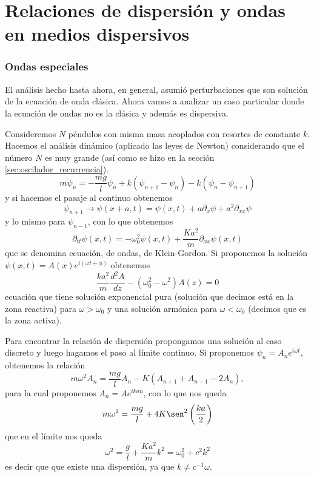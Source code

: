 \documentclass[a4paper,spanish]{article}
\numberwithin{equation}{section}
\begin{document}
\part{Relaciones de dispersi\'on y ondas en medios dispersivos}

\section{Ondas especiales}
	El an\'alisis hecho hasta ahora, en general, asumi\'o perturbaciones que son soluci\'on de la ecuaci\'on de onda cl\'asica. Ahora vamos a analizar un caso particular donde la ecuaci\'on de ondas no es la cl\'asica y adem\'as es dispersiva. 
	
	Consideremos $N$ p\'endulos con misma masa acoplados con resortes de constante $k$. Hacemos el an\'alisis din\'amico (aplicado las leyes de Newton) considerando que el n\'umero $N$ es muy grande (as\'i como se hizo en la secci\'on \ref{sec:oscilador_recurrencia}).
	\[ m \ddot{\psi}_n = - \frac{m g}{l} \psi_n + k (\psi_{n+1} - \psi_n) - k ( \psi_n - \psi_{n+1}) \]
	y si hacemos el pasaje al continuo obtenemos \[\psi_{n+1} \to \psi(x + a, t) = \psi(x, t) + a \partial_x \psi + a^2 \partial_{xx} \psi\] y lo mismo para $\psi_{n-1}$, con lo que obtenemos
	\begin{equation}
		\partial_{tt} \psi(x,t) = - \omega_0^2 \psi(x,t) + \frac{K a^2}{m} \partial_{xx} \psi(x,t)
		\label{eq:ondas_klein_gordon}
	\end{equation}
	que se denomina ecuaci\'on, de ondas, de Klein-Gordon. Si proponemos la soluci\'on $\psi(x,t) = A(x) e^{i (\omega t + \phi)}$ obtenemos
	\[ \frac{k a^2}{m} \frac{d^2 A}{d z} - (\omega_0^2 - \omega^2)A(z) = 0\]
	ecuaci\'on que tiene soluci\'on exponencial pura (soluci\'on que decimos est\'a en la zona reactiva) para $\omega > \omega_0$ y una soluci\'on arm\'onica para $\omega < \omega_0$ (decimos que es la zona activa). 
	
	Para encontrar la relaci\'on de dispersi\'on propongamos una soluci\'on al caso discreto y luego hagamos el paso al l\'imite continuo. Si proponemos $\psi_n = A_n e^{i \omega t}$, obtenemos la relaci\'on \[m \omega^2 A_n = \frac{m g}{l} A_n - K (A_{n+1} + A_{n-1} - 2 A_n),\] para la cual proponemos $A_n = A e^{i k a n}$, con lo que nos queda \[m \omega^2 = \frac{m g}{l} + 4 K \sen^2\left(\frac{k a}{2}\right)\] que en el l\'imite nos queda
	\begin{equation}
		\omega^2 = \frac{g}{l} + \frac{K a^2}{m} k^2 = \omega_0^2 + c^2 k^2
		\label{eq:ondas_klein_gordon_dispersion}
	\end{equation}
	es decir que que existe una dispersi\'on, ya que $k \neq c^{-1} \omega$.
	
\end{document}
